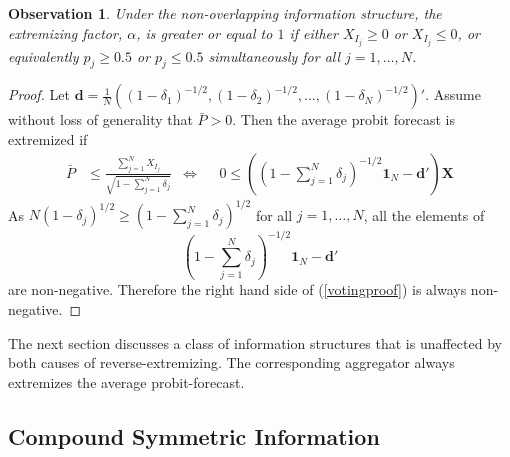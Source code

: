 \documentclass[11pt]{article}
\newtheorem{observation}[theorem]{Observation}
\theoremstyle{definition}
\theoremstyle{definition}
\begin{document}
\begin{observation}
\label{positiveThmVote}
Under the non-overlapping information structure, the extremizing factor, $\alpha$, is greater or equal to $1$ if either $X_{I_j} \geq 0$ or  $X_{I_j} \leq 0$, or equivalently $p_j \geq 0.5$ or $p_j \leq 0.5$ simultaneously for all $j = 1, \dots, N$. 
\end{observation}
\begin{proof} 
Let $\boldsymbol{d} = \frac{1}{N}\left((1-\delta_1)^{-1/2}, (1-\delta_2)^{-1/2}, \dots, (1-\delta_N)^{-1/2}\right)'$. Assume without loss of generality that $\bar{P} > 0$. Then the average probit forecast is extremized if
\begin{align}
 \bar{P}&\leq  \frac{\sum_{j=1}^N X_{I_j}}{\sqrt{1 - \sum_{j=1}^N \delta_j}} &\Leftrightarrow&& 0 \leq  \left(  \left(1 - \sum_{j=1}^N \delta_j \right)^{-1/2} \boldsymbol{1}_N - \boldsymbol{d}' \right) \boldsymbol{X} \label{votingproof}
\end{align}
 As $N (1-\delta_j)^{1/2} \geq \left(1 - \sum_{j=1}^N \delta_j \right)^{1/2}$ for all $j = 1, \dots, N$, all the elements of $$\left(1 - \sum_{j=1}^N \delta_j \right)^{-1/2} \boldsymbol{1}_N - \boldsymbol{d}' $$ are non-negative. Therefore the right hand side of (\ref{votingproof}) is always non-negative. 
\end{proof}
The next section discusses a class of information structures that is unaffected by both causes of reverse-extremizing. The corresponding aggregator always extremizes the average probit-forecast. 

\subsection{Compound Symmetric Information}
\label{compound}
\end{document}
